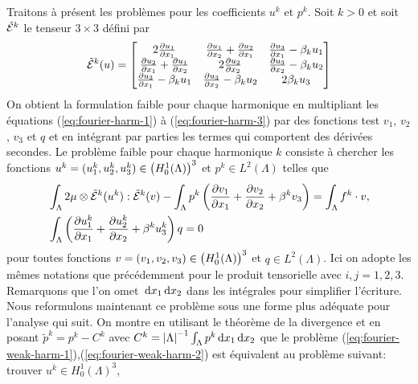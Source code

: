 Traitons à présent les problèmes pour les coefficients $u^k$ et
$p^k$. Soit $k > 0$ et soit $\tilde {\mathcal E}^k$ le tenseur $3\times
3$ défini par
\begin{equation}
  \tilde{\mathcal E}^k(u) = \begin{bmatrix}
     2\frac{\partial u_1}{\partial x_1}
    & \frac{\partial u_1}{\partial x_2} + \frac{\partial u_2}{\partial x_1}
    & \frac{\partial u_3}{\partial x_1} - \beta_k u_1 \\
       \frac{\partial u_2}{\partial x_1} + \frac{\partial u_1}{\partial x_2}
    & 2\frac{\partial u_2}{\partial x_2}
    &  \frac{\partial u_3}{\partial x_2} - \beta_k u_2 \\
       \frac{\partial u_3}{\partial x_1} - \beta_k u_1
    &  \frac{\partial u_3}{\partial x_2} - \beta_k u_2
    & 2\beta_k u_3
  \end{bmatrix}
\end{equation}
On obtient la formulation faible pour chaque harmonique en multipliant
les équations (\ref{eq:fourier-harm-1}) à (\ref{eq:fourier-harm-3})
par des fonctions test $v_1$, $v_2$, $v_3$ et $q$ et en intégrant par
parties les termes qui comportent des dérivées secondes. Le problème
faible pour chaque harmonique $k$ consiste à chercher les fonctions
$u^k = (u_1^k,u_2^k,u_3^k)\in \left( H^1_0(\Lambda) \right)^3$ et $p^k\in
L^2(\Lambda)$ telles que
\begin{align}
  &\int_\Lambda 2\mu\otimes\tilde{\mathcal E}^k(u^k):\tilde{\mathcal E}^k(v)
  - \int_\Lambda p^k\left( \frac{\partial v_1}{\partial x_1} +
    \frac{\partial v_2}{\partial x_2} + \beta^k v_3 \right)
  = \int_\Lambda f^k\cdot v,\label{eq:fourier-weak-harm-1}\\
  &\int_\Lambda \left( \frac{\partial u_1^k}{\partial x_1} + \frac{\partial u_2^k}{\partial x_2} + \beta^k u_3^k \right)q = 0\label{eq:fourier-weak-harm-2}
\end{align}
pour toutes fonctions $v = (v_1,v_2,v_3)\in \left( H^1_0(\Lambda) \right)^3$
et $q\in L^2(\Lambda)$. Ici on adopte les mêmes notations que
précédemment pour le produit tensorielle avec $i,j =
1,2,3$. Remarquons que l'on omet $\,\mathrm dx_1\,\mathrm dx_2$ dans les
intégrales pour simplifier l'écriture. Nous reformulons maintenant ce
problème sous une forme plus adéquate pour l'analyse qui suit.  On
montre en utilisant le théorème de la divergence et en posant $\tilde
p^k = p^k - C^k$ avec $C^k = \left\lvert \Lambda \right\rvert^{-1} \int_\Lambda
p^k\,\mathrm dx_1\,\mathrm dx_2$ que le problème
(\ref{eq:fourier-weak-harm-1}),(\ref{eq:fourier-weak-harm-2}) est
équivalent au problème suivant: trouver $u^k\in H^1_0(\Lambda)^3$,
